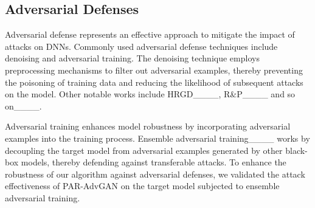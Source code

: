 \subsection{Adversarial Defenses}
Adversarial defense represents an effective approach to mitigate the impact of attacks on DNNs. Commonly used adversarial defense techniques include denoising and adversarial training. The denoising technique employs preprocessing mechanisms to filter out adversarial examples, thereby preventing the poisoning of training data and reducing the likelihood of subsequent attacks on the model. Other notable works include HRGD____, R\&P____ and so on____.

Adversarial training enhances model robustness by incorporating adversarial examples into the training process. Ensemble adversarial training____ works by decoupling the target model from adversarial examples generated by other black-box models, thereby defending against transferable attacks. To enhance the robustness of our algorithm against adversarial defenses, we validated the attack effectiveness of PAR-AdvGAN on the target model subjected to ensemble adversarial training.


%